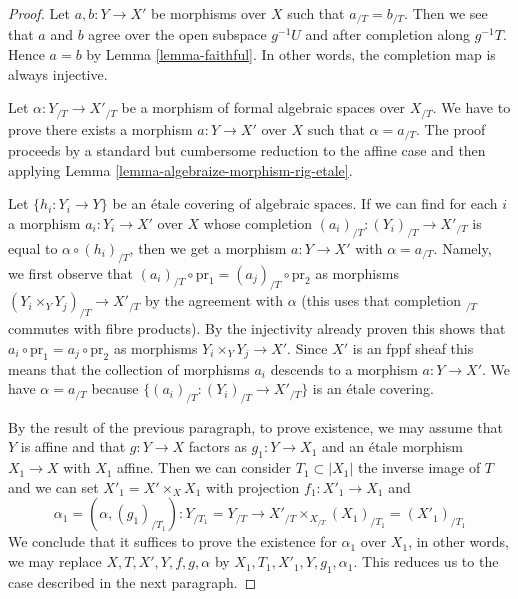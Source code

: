 \documentclass{stacks-project}
\theoremstyle{plain}
\theoremstyle{definition}
\theoremstyle{remark}
\numberwithin{equation}{subsection}
\begin{document}
\begin{proof}
Let $a, b : Y \to X'$ be morphisms over $X$ such that
$a_{/T} = b_{/T}$. Then we see that $a$ and $b$ agree over the open
subspace $g^{-1}U$ and after completion along $g^{-1}T$.
Hence $a = b$ by Lemma \ref{lemma-faithful}.
In other words, the completion map is always injective.

\medskip\noindent
Let $\alpha : Y_{/T} \to X'_{/T}$ be a morphism of formal algebraic spaces
over $X_{/T}$. We have to prove there exists a morphism $a : Y \to X'$
over $X$ such that $\alpha = a_{/T}$. The proof proceeds by a standard
but cumbersome reduction to the affine case and then applying
Lemma \ref{lemma-algebraize-morphism-rig-etale}.

\medskip\noindent
Let $\{h_i : Y_i \to Y\}$ be an \'etale covering of algebraic spaces.
If we can find for each $i$ a morphism $a_i : Y_i \to X'$ over $X$
whose completion $(a_i)_{/T} : (Y_i)_{/T} \to X'_{/T}$ is equal to
$\alpha \circ (h_i)_{/T}$, then we get a morphism $a : Y \to X'$
with $\alpha = a_{/T}$. Namely, we first observe that
$(a_i)_{/T} \circ \text{pr}_1 = (a_j)_{/T} \circ \text{pr}_2$
as morphisms $(Y_i \times_Y Y_j)_{/T} \to X'_{/T}$ by the
agreement with $\alpha$ (this uses that completion ${}_{/T}$ commutes
with fibre products). By the injectivity already proven this shows that
$a_i \circ \text{pr}_1 = a_j \circ \text{pr}_2$ as morphisms
$Y_i \times_Y Y_j \to X'$. Since $X'$ is an fppf sheaf this means that
the collection of morphisms $a_i$ descends to a morphism $a : Y \to X'$.
We have $\alpha = a_{/T}$ because $\{(a_i)_{/T} : (Y_i)_{/T} \to X'_{/T}\}$
is an \'etale covering.

\medskip\noindent
By the result of the previous paragraph, to prove existence,
we may assume that $Y$ is affine and that $g : Y \to X$ factors
as $g_1 : Y \to X_1$ and an \'etale morphism $X_1 \to X$ with $X_1$ affine.
Then we can consider $T_1 \subset |X_1|$ the inverse image of $T$
and we can set $X'_1 = X' \times_X X_1$ with projection $f_1 : X'_1 \to X_1$
and
$$
\alpha_1 = (\alpha, (g_1)_{/T_1}) :
Y_{/T_1} = Y_{/T}
\longrightarrow
X'_{/T} \times_{X_{/T}} (X_1)_{/T_1} = (X'_1)_{/T_1}
$$
We conclude that it suffices to prove the existence for $\alpha_1$
over $X_1$, in other words, we may replace $X, T, X', Y, f, g, \alpha$
by $X_1, T_1, X'_1, Y, g_1, \alpha_1$.
This reduces us to the case described in the next paragraph.


\end{proof}
\end{document}
